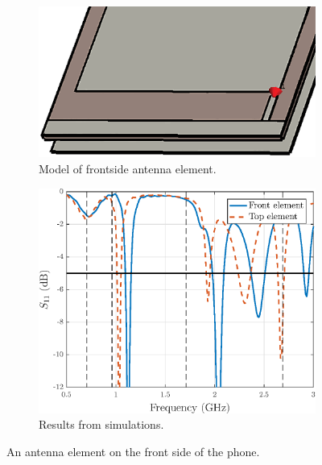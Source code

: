 \begin{figure}[H]
    \vspace{-7pt}
    \centering
    \begin{subfigure}[b]{0.49\textwidth}
        \includegraphics[width=\textwidth]{img/front.eps}
        \caption{Model of frontside antenna element.}
        \label{fig:front_model}
    \end{subfigure}
    \begin{subfigure}[b]{0.49\textwidth}
        \includegraphics[width=\textwidth]{img/front_res.eps}
        \caption{Results from simulations.}
        \label{fig:front_res}
    \end{subfigure}
    \caption{An antenna element on the front side of the phone.}
    \label{fig:front_elem}
\end{figure}


